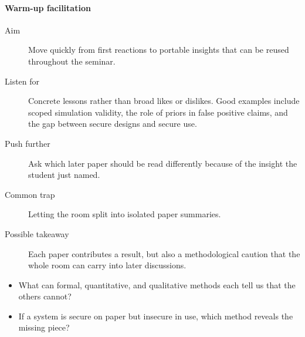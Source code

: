 \paragraph{Warm-up facilitation}
\begin{description}
  \item[Aim] Move quickly from first reactions to portable insights that can
    be reused throughout the seminar.
  \item[Listen for] Concrete lessons rather than broad likes or dislikes. Good
    examples include scoped simulation validity, the role of priors in false
    positive claims, and the gap between secure designs and secure use.
  \item[Push further] Ask which later paper should be read differently because
    of the insight the student just named.
  \item[Common trap] Letting the room split into isolated paper summaries.
  \item[Possible takeaway] Each paper contributes a result, but also a
    methodological caution that the whole room can carry into later
    discussions.
\end{description}

\begin{frame}
  \begin{question}
    \begin{itemize}
      \item What can formal, quantitative, and qualitative methods each tell
        us that the others cannot?
      \item If a system is secure on paper but insecure in use, which method
        reveals the missing piece?
    \end{itemize}
  \end{question}
\end{frame}

